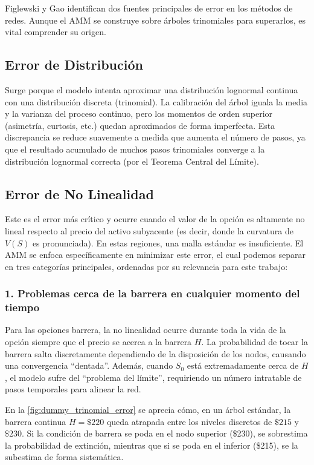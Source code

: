 Figlewski y Gao identifican dos fuentes principales de error en los métodos de redes. Aunque el AMM se construye sobre árboles trinomiales para superarlos, es vital comprender su origen.

\subsection{Error de Distribución}

Surge porque el modelo intenta aproximar una distribución lognormal continua con una distribución discreta (trinomial). La calibración del árbol iguala la media y la varianza del proceso continuo, pero los momentos de orden superior (asimetría, curtosis, etc.) quedan aproximados de forma imperfecta. Esta discrepancia se reduce suavemente a medida que aumenta el número de pasos, ya que el resultado acumulado de muchos pasos trinomiales converge a la distribución lognormal correcta (por el Teorema Central del Límite).

\subsection{Error de No Linealidad}

Este es el error más crítico y ocurre cuando el valor de la opción es altamente no lineal respecto al precio del activo subyacente (es decir, donde la curvatura de $V(S)$ es pronunciada). En estas regiones, una malla estándar es insuficiente. El AMM se enfoca específicamente en minimizar este error, el cual podemos separar en tres categorías principales, ordenadas por su relevancia para este trabajo:

\subsubsection{1. Problemas cerca de la barrera en cualquier momento del tiempo}
Para las opciones barrera, la no linealidad ocurre durante toda la vida de la opción siempre que el precio se acerca a la barrera $H$. La probabilidad de tocar la barrera salta discretamente dependiendo de la disposición de los nodos, causando una convergencia ``dentada''. Además, cuando $S_0$ está extremadamente cerca de $H$, el modelo sufre del ``problema del límite'', requiriendo un número intratable de pasos temporales para alinear la red.

En la \autoref{fig:dummy_trinomial_error} se aprecia cómo, en un árbol estándar, la barrera continua $H=\$220$ queda atrapada entre los niveles discretos de $\$215$ y $\$230$. Si la condición de barrera se poda en el nodo superior (\$230), se sobrestima la probabilidad de extinción, mientras que si se poda en el inferior (\$215), se la subestima de forma sistemática.

